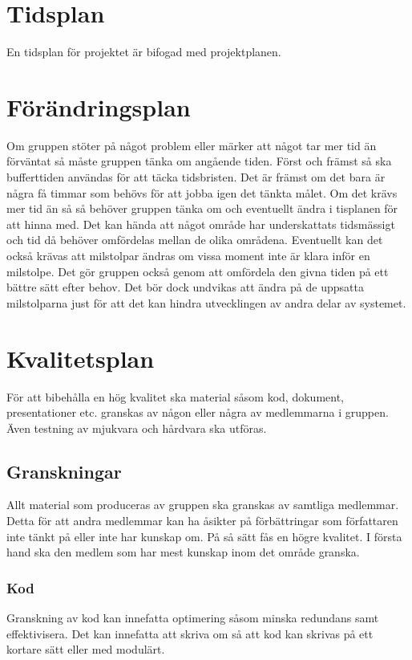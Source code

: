 \documentclass[projektplan/plan.tex]{subfiles}
\begin{document}
\section{Tidsplan}
En tidsplan för projektet är bifogad med projektplanen.

\section{Förändringsplan}
Om gruppen stöter på något problem eller märker att något tar mer tid än
förväntat så måste gruppen tänka om angående tiden. Först och främst så ska
bufferttiden användas för att täcka tidsbristen. Det är främst om det bara är
några få timmar som behövs för att jobba igen det tänkta målet. Om det krävs
mer tid än så så behöver gruppen tänka om och eventuellt ändra i tisplanen för
att hinna med. Det kan hända att något område har underskattats tidsmässigt och
tid då behöver omfördelas mellan de olika områdena. Eventuellt kan det också
krävas att milstolpar ändras om vissa moment inte är klara inför en milstolpe.
Det gör gruppen också genom att omfördela den givna tiden på ett bättre sätt
efter behov. Det bör dock undvikas att ändra på de uppsatta milstolparna just
för att det kan hindra utvecklingen av andra delar av systemet.

\section{Kvalitetsplan}
För att bibehålla en hög kvalitet ska material såsom kod, dokument,
presentationer etc. granskas av någon eller några av medlemmarna i gruppen.
Även testning av mjukvara och hårdvara ska utföras.

\subsection{Granskningar}
Allt material som produceras av gruppen ska granskas av samtliga medlemmar.
Detta för att andra medlemmar kan ha åsikter på förbättringar som författaren
inte tänkt på eller inte har kunskap om. På så sätt fås en högre kvalitet. I
första hand ska den medlem som har mest kunskap inom det område granska.

\subsubsection{Kod}	
Granskning av kod kan innefatta optimering såsom minska redundans samt
effektivisera. Det kan innefatta att skriva om så att kod kan skrivas på ett
kortare sätt eller med modulärt.
\end{document}
